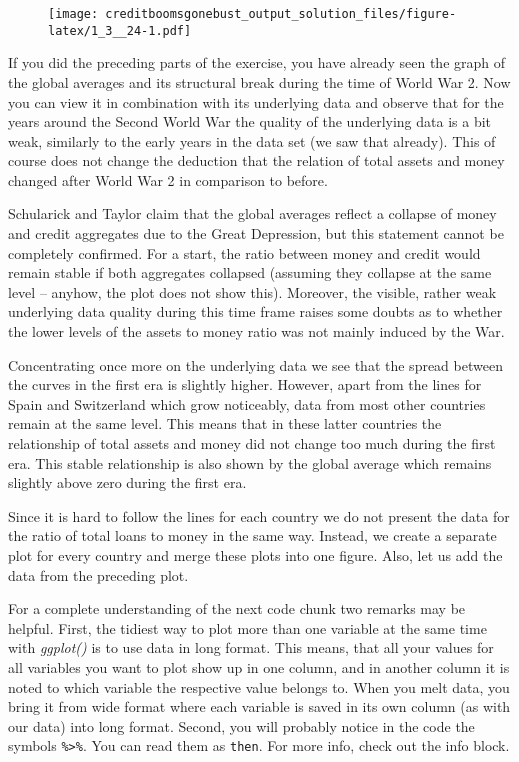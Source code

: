 \documentclass[a4paper,11pt,abstract=on]{scrartcl}
\begin{document}
{\begin{figure}[H]
    \centering
\texttt{[image: creditboomsgonebust\_output\_solution\_files/figure-latex/1\_3\_\_24-1.pdf]}
\end{figure}

\begin{spacing}{1.08}
If you did the preceding parts of the exercise, you have already seen
the graph of the global averages and its structural break during the
time of World War 2. Now you can view it in combination with its
underlying data and observe that for the years around the Second World
War the quality of the underlying data is a bit weak, similarly to the
early years in the data set (we saw that already). This of course does
not change the deduction that the relation of total assets and money
changed after World War 2 in comparison to before.

Schularick and Taylor claim that the global averages reflect a collapse
of money and credit aggregates due to the Great Depression, but this
statement cannot be completely confirmed. For a start, the ratio between
money and credit would remain stable if both aggregates collapsed
(assuming they collapse at the same level -- anyhow, the plot does not
show this). Moreover, the visible, rather weak underlying data quality
during this time frame raises some doubts as to whether the lower levels
of the assets to money ratio was not mainly induced by the War.

Concentrating once more on the underlying data we see that the spread
between the curves in the first era is slightly higher. However, apart
from the lines for Spain and Switzerland which grow noticeably, data
from most other countries remain at the same level. This means that in
these latter countries the relationship of total assets and money did
not change too much during the first era. This stable relationship is
also shown by the global average which remains slightly above zero
during the first era.

Since it is hard to follow the lines for each country we do not present
the data for the ratio of total loans to money in the same way. Instead,
we create a separate plot for every country and merge these plots into
one figure. Also, let us add the data from the preceding plot.

For a complete understanding of the next code chunk two remarks may be
helpful. First, the tidiest way to plot more than one variable at the
same time with \emph{ggplot()} is to use data in long format. This
means, that all your values for all variables you want to plot show up
in one column, and in another column it is noted to which variable the
respective value belongs to. When you melt data, you bring it from wide
format where each variable is saved in its own column (as with our data)
into long format. Second, you will probably notice in the code the
symbols \texttt{\%\textgreater{}\%}. You can read them as \texttt{then}.
For more info, check out the info block.
\end{spacing}

}
\end{document}
